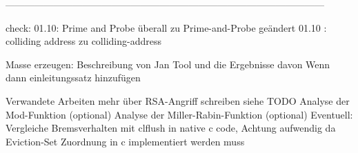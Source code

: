 ---------------------------------------------------------------------------------------------------


check: 01.10: Prime and Probe überall zu Prime-and-Probe geändert
01.10 : colliding address zu colliding-address

Masse erzeugen:
Beschreibung von Jan Tool und die Ergebnisse davon
Wenn dann einleitungssatz hinzufügen

Verwandete Arbeiten mehr über RSA-Angriff schreiben siehe TODO
Analyse der Mod-Funktion (optional)
Analyse der Miller-Rabin-Funktion (optional)
Eventuell: Vergleiche Bremsverhalten mit clflush in native c code,
Achtung aufwendig da Eviction-Set Zuordnung in c implementiert werden muss



